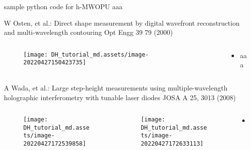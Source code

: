 \documentclass[t, aspectratio=169]{beamer}
\begin{document}
\begin{frame}{sample python code for h-MWOPU}
aaa
\end{frame}


\begin{frame}{W Osten, et al.: Direct shape measurement by digital wavefront reconstruction and multi-wavelength contouring}
	\vspace{-3 mm}
	\small Opt Engg 39 79 (2000)
	\begin{columns}
		\begin{column}{.6\textwidth}
			\begin{figure}
				\texttt{[image: DH\_tutorial\_md.assets/image-20220427150423735]}
			\end{figure}
		\end{column}
		\begin{column}{.4\textwidth}
			\begin{itemize}
				\item aaa
			\end{itemize}
		\end{column}
	\end{columns}
\end{frame}


\begin{frame}{A Wada, et al.: Large step-height measurements using multiple-wavelength holographic interferometry with tunable laser diodes}
	\vspace{-3 mm}
	\small JOSA A 25, 3013 (2008)
	\begin{columns}
		\begin{column}{.45\textwidth}
			\begin{figure}
				\texttt{[image: DH\_tutorial\_md.assets/image-20220427172539858]}
			\end{figure}
		\end{column}
		\begin{column}{.15\textwidth}
			\begin{figure}
				\texttt{[image: DH\_tutorial\_md.assets/image-20220427172633113]}
			\end{figure}
		\end{column}
		\begin{column}{.4\textwidth}
			\begin{itemize}
				\item aaa
			\end{itemize}
		\end{column}
	\end{columns}
\end{frame}
\end{document}
